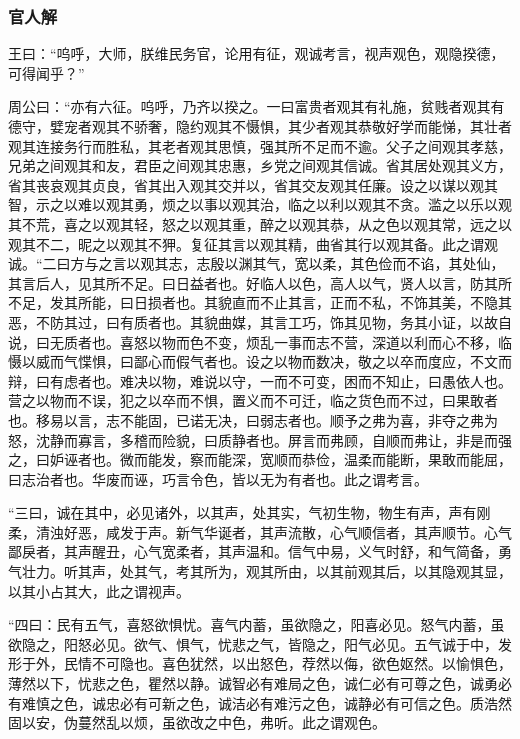 \documentclass[]{article}
\begin{document}
\hypertarget{header-n311}{%
\subsubsection{官人解}\label{header-n311}}

王曰：``呜呼，大师，朕维民务官，论用有征，观诚考言，视声观色，观隐揆德，可得闻乎？''

周公曰：``亦有六征。呜呼，乃齐以揆之。一曰富贵者观其有礼施，贫贱者观其有德守，嬖宠者观其不骄奢，隐约观其不慑惧，其少者观其恭敬好学而能悌，其壮者观其连接务行而胜私，其老者观其思慎，强其所不足而不逾。父子之间观其孝慈，兄弟之间观其和友，君臣之间观其忠惠，乡党之间观其信诚。省其居处观其义方，省其丧哀观其贞良，省其出入观其交并以，省其交友观其任廉。设之以谋以观其智，示之以难以观其勇，烦之以事以观其治，临之以利以观其不贪。滥之以乐以观其不荒，喜之以观其轻，怒之以观其重，醉之以观其恭，从之色以观其常，远之以观其不二，昵之以观其不狎。复征其言以观其精，曲省其行以观其备。此之谓观诚。``二曰方与之言以观其志，志殷以渊其气，宽以柔，其色俭而不谄，其处仙，其言后人，见其所不足。曰日益者也。好临人以色，高人以气，贤人以言，防其所不足，发其所能，曰日损者也。其貌直而不止其言，正而不私，不饰其美，不隐其恶，不防其过，曰有质者也。其貌曲媒，其言工巧，饰其见物，务其小证，以故自说，曰无质者也。喜怒以物而色不变，烦乱一事而志不营，深道以利而心不移，临慑以威而气惵惧，曰鄙心而假气者也。设之以物而数决，敬之以卒而度应，不文而辩，曰有虑者也。难决以物，难说以守，一而不可变，困而不知止，曰愚依人也。营之以物而不误，犯之以卒而不惧，置义而不可迁，临之货色而不过，曰果敢者也。移易以言，志不能固，已诺无决，曰弱志者也。顺予之弗为喜，非夺之弗为怒，沈静而寡言，多稽而险貌，曰质静者也。屏言而弗顾，自顺而弗让，非是而强之，曰妒诬者也。微而能发，察而能深，宽顺而恭俭，温柔而能断，果敢而能屈，曰志治者也。华废而诬，巧言令色，皆以无为有者也。此之谓考言。

``三曰，诚在其中，必见诸外，以其声，处其实，气初生物，物生有声，声有刚柔，清浊好恶，咸发于声。新气华诞者，其声流散，心气顺信者，其声顺节。心气鄙戾者，其声醒丑，心气宽柔者，其声温和。信气中易，义气时舒，和气简备，勇气壮力。听其声，处其气，考其所为，观其所由，以其前观其后，以其隐观其显，以其小占其大，此之谓视声。

``四曰：民有五气，喜怒欲惧忧。喜气内蓄，虽欲隐之，阳喜必见。怒气内蓄，虽欲隐之，阳怒必见。欲气、惧气，忧悲之气，皆隐之，阳气必见。五气诚于中，发形于外，民情不可隐也。喜色犹然，以出怒色，荐然以侮，欲色妪然。以愉惧色，薄然以下，忧悲之色，瞿然以静。诚智必有难局之色，诚仁必有可尊之色，诚勇必有难慎之色，诚忠必有可新之色，诚洁必有难污之色，诚静必有可信之色。质浩然固以安，伪蔓然乱以烦，虽欲改之中色，弗听。此之谓观色。
\end{document}
